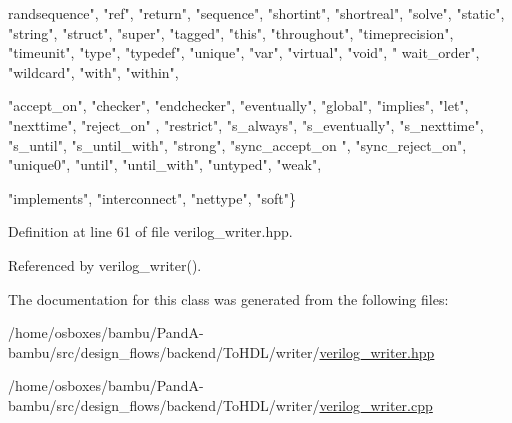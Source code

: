 \begin{DoxyCode}
{      randsequence"}, \textcolor{stringliteral}{"ref"}, \textcolor{stringliteral}{"return"},
    \textcolor{stringliteral}{"sequence"}, \textcolor{stringliteral}{"shortint"}, \textcolor{stringliteral}{"shortreal"}, \textcolor{stringliteral}{"solve"}, \textcolor{stringliteral}{"static"}, \textcolor{stringliteral}{"string"}, \textcolor{stringliteral}{"struct"}, \textcolor{stringliteral}{"super"}, \textcolor{stringliteral}{"tagged"}, \textcolor{stringliteral}{"this"}, \textcolor{stringliteral}{
      "throughout"}, \textcolor{stringliteral}{"timeprecision"}, \textcolor{stringliteral}{"timeunit"}, \textcolor{stringliteral}{"type"}, \textcolor{stringliteral}{"typedef"}, \textcolor{stringliteral}{"unique"}, \textcolor{stringliteral}{"var"}, \textcolor{stringliteral}{"virtual"}, \textcolor{stringliteral}{"void"}, \textcolor{stringliteral}{"
      wait\_order"}, \textcolor{stringliteral}{"wildcard"}, \textcolor{stringliteral}{"with"}, \textcolor{stringliteral}{"within"},
    
    \textcolor{stringliteral}{"accept\_on"}, \textcolor{stringliteral}{"checker"}, \textcolor{stringliteral}{"endchecker"}, \textcolor{stringliteral}{"eventually"}, \textcolor{stringliteral}{"global"}, \textcolor{stringliteral}{"implies"}, \textcolor{stringliteral}{"let"}, \textcolor{stringliteral}{"nexttime"}, \textcolor{stringliteral}{"reject\_on"}
      , \textcolor{stringliteral}{"restrict"}, \textcolor{stringliteral}{"s\_always"}, \textcolor{stringliteral}{"s\_eventually"}, \textcolor{stringliteral}{"s\_nexttime"}, \textcolor{stringliteral}{"s\_until"}, \textcolor{stringliteral}{"s\_until\_with"}, \textcolor{stringliteral}{"strong"}, \textcolor{stringliteral}{"sync\_accept\_on
      "}, \textcolor{stringliteral}{"sync\_reject\_on"}, \textcolor{stringliteral}{"unique0"}, \textcolor{stringliteral}{"until"},
    \textcolor{stringliteral}{"until\_with"}, \textcolor{stringliteral}{"untyped"}, \textcolor{stringliteral}{"weak"},
    
    \textcolor{stringliteral}{"implements"}, \textcolor{stringliteral}{"interconnect"}, \textcolor{stringliteral}{"nettype"}, \textcolor{stringliteral}{"soft"}\}
\end{DoxyCode}


Definition at line 61 of file verilog\+\_\+writer.\+hpp.



Referenced by verilog\+\_\+writer().



The documentation for this class was generated from the following files\+:\begin{DoxyCompactItemize}
\item 
/home/osboxes/bambu/\+Pand\+A-\/bambu/src/design\+\_\+flows/backend/\+To\+H\+D\+L/writer/\hyperlink{verilog__writer_8hpp}{verilog\+\_\+writer.\+hpp}\item 
/home/osboxes/bambu/\+Pand\+A-\/bambu/src/design\+\_\+flows/backend/\+To\+H\+D\+L/writer/\hyperlink{verilog__writer_8cpp}{verilog\+\_\+writer.\+cpp}\end{DoxyCompactItemize}
